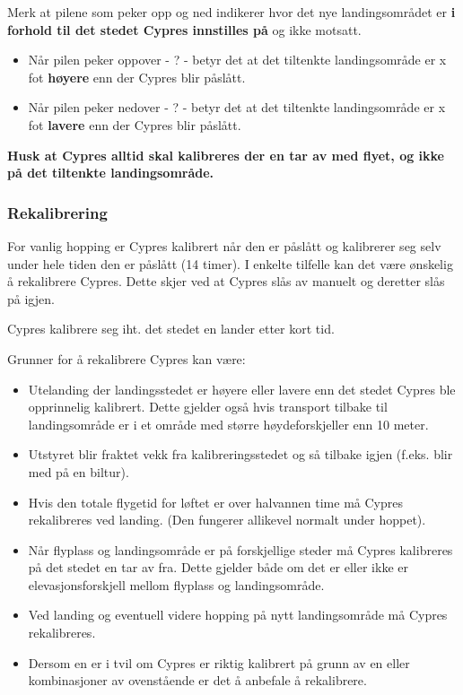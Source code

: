 Merk at pilene som peker opp og ned indikerer hvor det nye landingsområdet er \textbf{i forhold til det stedet Cypres innstilles på} og ikke motsatt.
\begin{itemize}
\item Når pilen peker oppover - ? - betyr det at det tiltenkte landingsområde er x fot \textbf{høyere} enn der Cypres blir påslått.
\item Når pilen peker nedover - ? - betyr det at det tiltenkte landingsområde er x fot \textbf{lavere} enn der Cypres blir påslått.
\end{itemize}

\textbf{Husk at Cypres alltid skal kalibreres der en tar av med flyet, og ikke på det tiltenkte landingsområde.}

\subsubsection{Rekalibrering}
For vanlig hopping er Cypres kalibrert når den er påslått og kalibrerer seg selv under hele tiden den er påslått (14 timer). I enkelte tilfelle kan det være ønskelig å rekalibrere Cypres. Dette skjer ved at Cypres slås av manuelt og deretter slås på igjen.

Cypres kalibrere seg iht. det stedet en lander etter kort tid.

Grunner for å rekalibrere Cypres kan være:
\begin{itemize}
\item Utelanding der landingsstedet er høyere eller lavere enn det stedet Cypres ble opprinnelig kalibrert. Dette gjelder også hvis transport tilbake til landingsområde er i et område med større høydeforskjeller enn 10 meter.
\item Utstyret blir fraktet vekk fra kalibreringsstedet og så tilbake igjen (f.eks. blir med på en biltur).
\item Hvis den totale flygetid for løftet er over halvannen time må Cypres rekalibreres ved landing. (Den fungerer allikevel normalt under hoppet).
\item Når flyplass og landingsområde er på forskjellige steder må Cypres kalibreres på det stedet en tar av fra. Dette gjelder både om det er eller ikke er elevasjonsforskjell mellom flyplass og landingsområde.
\item Ved landing og eventuell videre hopping på nytt landingsområde må Cypres rekalibreres.
\item Dersom en er i tvil om Cypres er riktig kalibrert på grunn av en eller kombinasjoner av ovenstående er det å anbefale å rekalibrere.
\end{itemize}


